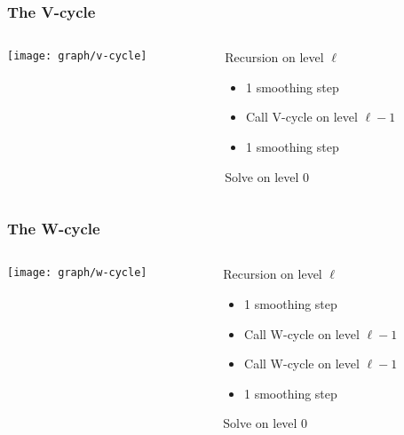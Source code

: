 \begin{frame}
  \frametitle{The V-cycle}
  \begin{columns}
    \begin{column}{.5\textwidth}
    \texttt{[image: graph/v-cycle]}      
    \end{column}
    \begin{column}{.5\textwidth}
      Recursion on level $\ell$
      \begin{itemize}
      \item 1 smoothing step
      \item Call V-cycle on level $\ell-1$
      \item 1 smoothing step
      \end{itemize}
      Solve on level 0
    \end{column}
  \end{columns}
  \begin{center}
  \end{center}
\end{frame}

\begin{frame}
  \frametitle{The W-cycle}
  \begin{columns}
    \begin{column}{.5\textwidth}
    \texttt{[image: graph/w-cycle]}
    \end{column}
    \begin{column}{.5\textwidth}
      Recursion on level $\ell$
      \begin{itemize}
      \item 1 smoothing step
      \item Call W-cycle on level $\ell-1$
      \item Call W-cycle on level $\ell-1$
      \item 1 smoothing step
      \end{itemize}
      Solve on level 0
    \end{column}
  \end{columns}
  \begin{center}
  \end{center}
\end{frame}

